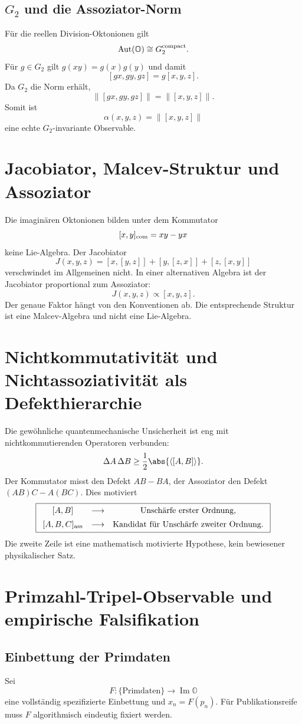 \documentclass[11pt,a4paper]{article}
\newcommand{\OO}{\mathbb O}
\newcommand{\norm}[1]{\left\lVert #1 \right\rVert}
\newcommand{\Aut}{\operatorname{Aut}}
\begin{document}
\subsection{$G_2$ und die Assoziator-Norm}
Für die reellen Division-Oktonionen gilt
\[
\Aut(\OO)\cong G_2^{\rm compact}.
\]
Für $g\in G_2$ gilt $g(xy)=g(x)g(y)$ und damit
\[
[gx,gy,gz]=g[x,y,z].
\]
Da $G_2$ die Norm erhält,
\[
\boxed{\norm{[gx,gy,gz]}=\norm{[x,y,z]}.}
\]
Somit ist
\[
\boxed{\alpha(x,y,z)=\norm{[x,y,z]}}
\]
eine echte $G_2$-invariante Observable.

\section{Jacobiator, Malcev-Struktur und Assoziator}
Die imaginären Oktonionen bilden unter dem Kommutator
\[
[x,y]_{\rm com}=xy-yx
\]
keine Lie-Algebra. Der Jacobiator
\[
J(x,y,z)=[x,[y,z]]+[y,[z,x]]+[z,[x,y]]
\]
verschwindet im Allgemeinen nicht. In einer alternativen Algebra ist der Jacobiator proportional zum Assoziator:
\[
\boxed{J(x,y,z)\propto[x,y,z].}
\]
Der genaue Faktor hängt von den Konventionen ab. Die entsprechende Struktur ist eine Malcev-Algebra und nicht eine Lie-Algebra.

\section{Nichtkommutativität und Nichtassoziativität als Defekthierarchie}
Die gewöhnliche quantenmechanische Unsicherheit ist eng mit nichtkommutierenden Operatoren verbunden:
\[
\Delta A\,\Delta B\ge\frac12\abs{\langle[A,B]\rangle}.
\]
Der Kommutator misst den Defekt $AB-BA$, der Assoziator den Defekt $(AB)C-A(BC)$. Dies motiviert
\[
\boxed{
\begin{array}{ccc}
[A,B]&\longrightarrow&\text{Unschärfe erster Ordnung},\\[0.5em]
[A,B,C]_{\rm ass}&\longrightarrow&\text{Kandidat für Unschärfe zweiter Ordnung}.
\end{array}}
\]
Die zweite Zeile ist eine mathematisch motivierte Hypothese, kein bewiesener physikalischer Satz.

\section{Primzahl-Tripel-Observable und empirische Falsifikation}
\subsection{Einbettung der Primdaten}
Sei
\[
F:\{\text{Primdaten}\}\to\operatorname{Im}\OO
\]
eine vollständig spezifizierte Einbettung und $x_n=F(p_n)$. Für Publikationsreife muss $F$ algorithmisch eindeutig fixiert werden.
\end{document}
